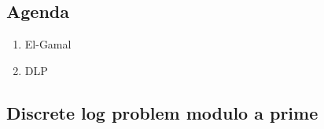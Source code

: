 

\subsection{Agenda}
\begin{enumerate}
\item El-Gamal
\item DLP
\end{enumerate}

\subsection{Discrete log problem modulo a prime}
